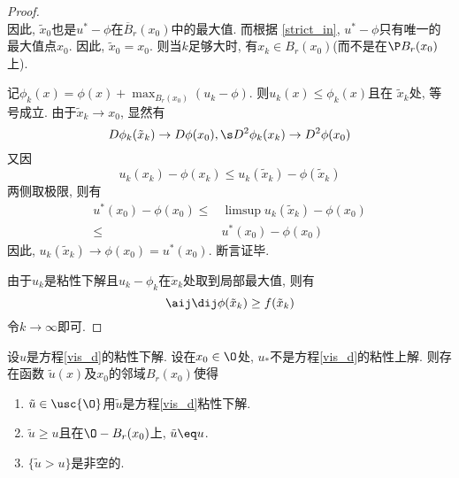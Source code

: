 \begin{proof}
\begin{equation}
    \end{equation}
    因此, $\tilde{x}_0$也是$u^*-\phi$在$\overline{B}_r(x_0)$中的最大值. 而根据 \eqref{strict_in}, $u^*-\phi$只有唯一的最大值点$x_0$. 因此, $\tilde{x}_0=x_0$. 则当$k$足够大时,  有$x_k \in B_r(x_0)$(而不是在$\P B_r(x_0)$上).
    \par 记$\phi_k(x)=\phi(x)+\max_{B_r(x_0)}(u_k-\phi)$. 则$u_k(x) \le \phi_k(x)$且在 $\tilde{x}_k$处, 等号成立. 由于$\tilde{x}_k \to x_0$,  显然有
    \begin{equation}
        D\phi_k(\tilde{x}_k) \to D\phi(x_0), \s D^2\phi_k(x_k) \to D^2\phi(x_0)
    \end{equation}
    又因
    \begin{equation}
        u_k(x_k) -\phi(x_k) \le u_k(\tilde{x}_k) - \phi(\tilde{x}_k)
    \end{equation}
    两侧取极限, 则有
    \begin{equation}
        \begin{split}
            u^*(x_0)-\phi(x_0) \le& \limsup u_k(\tilde{x}_k)-\phi(x_0) \\
            \le & u^*(x_0)-\phi(x_0)
        \end{split}
    \end{equation}
    因此, $u_k(\tilde{x}_k) \to \phi(x_0) = u^*(x_0)$. 断言证毕.
    \par 由于$u_k$是粘性下解且$u_k-\phi_k$在$\tilde{x}_k$处取到局部最大值, 则有
    \begin{equation}
        \aij \dij \phi(\tilde{x}_k) \ge f(\tilde{x}_k)
    \end{equation}
    令$k \to \infty$即可.
\end{proof}
\begin{lemma} \label{vis_l2}
    设$u$是方程\eqref{vis_d}的粘性下解. 设在$x_0 \in \O$处, $u_*$不是方程\eqref{vis_d}的粘性上解. 则存在函数 $\tilde{u}(x)$及$x_0$的邻域$B_r(x_0)$使得
    \begin{enumerate}
        \item $\tilde{u} \in \usc{\O}$用$\tilde{u}$是方程\eqref{vis_d}粘性下解.
        \item $\tilde{u} \ge u$且在$\O-B_r(x_0)$上, $\tilde{u}\eq u$.
        \item $\{\tilde{u}>u\}$是非空的.
    \end{enumerate}
\end{lemma}
